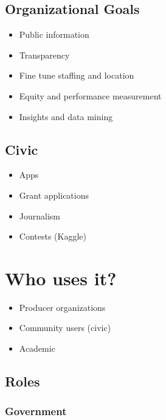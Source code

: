 \documentclass[
  openany]{book}
\providecommand{\tightlist}{%
  \setlength{\itemsep}{0pt}\setlength{\parskip}{0pt}}
\begin{document}
\hypertarget{organizational-goals}{%
\subsection{Organizational Goals}\label{organizational-goals}}

\begin{itemize}
\tightlist
\item
  Public information
\item
  Transparency
\item
  Fine tune staffing and location
\item
  Equity and performance measurement
\item
  Insights and data mining
\end{itemize}

\hypertarget{civic}{%
\subsection{Civic}\label{civic}}

\begin{itemize}
\tightlist
\item
  Apps
\item
  Grant applications
\item
  Journalism
\item
  Contests (Kaggle)
\end{itemize}

\hypertarget{who-uses-it}{%
\section{Who uses it?}\label{who-uses-it}}

\begin{itemize}
\tightlist
\item
  Producer organizations
\item
  Community users (civic)
\item
  Academic
\end{itemize}

\hypertarget{roles}{%
\subsection{Roles}\label{roles}}

\hypertarget{government}{%
\subsubsection{Government}\label{government}}
\end{document}
